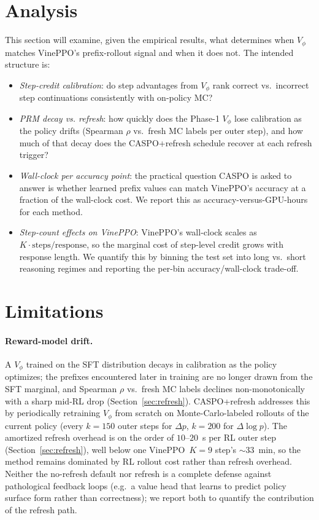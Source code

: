 \documentclass[11pt]{article}
\newcommand{\caspo}{\textsc{CASPO}}
\newcommand{\vineppo}{VinePPO}
\begin{document}
\section{Analysis}
\label{sec:analysis}

This section will examine, given the empirical results, what determines when
$V_\phi$ matches \vineppo{}'s prefix-rollout signal and when it does not. The
intended structure is:

\begin{itemize}
\item \emph{Step-credit calibration}: do step advantages from $V_\phi$ rank
correct vs.\ incorrect step continuations consistently with on-policy MC?
\item \emph{PRM decay vs. refresh}: how quickly does the Phase-1
$V_\phi$ lose calibration as the policy drifts (Spearman $\rho$ vs.\
fresh MC labels per outer step), and how much of that decay does the
\caspo{}+refresh schedule recover at each refresh trigger?
\item \emph{Wall-clock per accuracy point}: the practical question \caspo{}
is asked to answer is whether learned prefix values can match \vineppo{}'s
accuracy at a fraction of the wall-clock cost. We report this as
accuracy-versus-GPU-hours for each method.
\item \emph{Step-count effects on \vineppo{}}: \vineppo{}'s wall-clock
scales as $K \cdot \text{steps/response}$, so the marginal cost of step-level
credit grows with response length. We quantify this by binning the test set
into long vs.\ short reasoning regimes and reporting the per-bin
accuracy/wall-clock trade-off.
\end{itemize}

\section{Limitations}
\label{sec:limitations}

\paragraph{Reward-model drift.}
A $V_\phi$ trained on the SFT distribution decays in calibration as
the policy optimizes; the prefixes encountered later in training are
no longer drawn from the SFT marginal, and Spearman $\rho$ vs.\ fresh
MC labels declines non-monotonically with a sharp mid-RL drop
(Section~\ref{sec:refresh}). \caspo{}+refresh addresses this by
periodically retraining $V_\phi$ from scratch on Monte-Carlo-labeled
rollouts of the current policy (every $k{=}150$ outer steps for
$\Delta p$, $k{=}200$ for $\Delta\log p$). The amortized refresh
overhead is on the order of $10\text{--}20$~s per RL outer step
(Section~\ref{sec:refresh}), well below one \vineppo{}~$K{=}9$
step's ${\sim}33$~min, so the method remains dominated by RL rollout
cost rather than refresh overhead. Neither the no-refresh default nor refresh is a
complete defense against pathological feedback loops (e.g.\ a value
head that learns to predict policy surface form rather than
correctness); we report both to quantify the contribution of the
refresh path.
\end{document}
